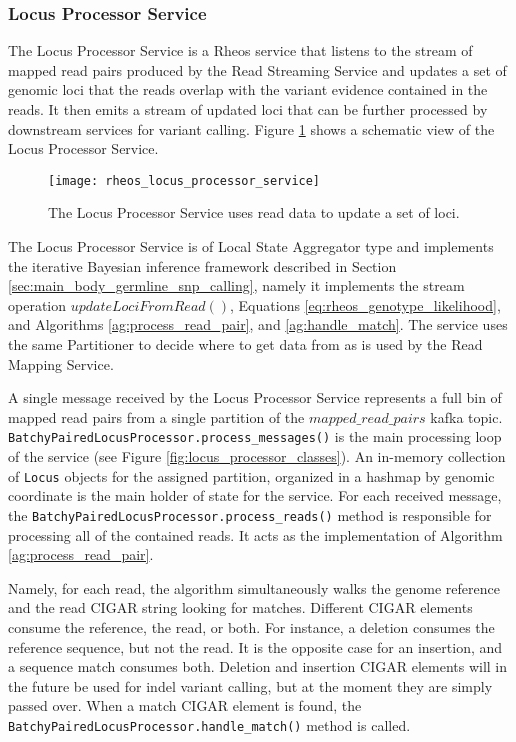 \subsubsection{Locus Processor Service}

The Locus Processor Service is a Rheos service that listens to the stream of mapped read pairs produced by the Read Streaming Service and updates a set of genomic loci that the reads overlap with the variant evidence contained in the reads. It then emits a stream of updated loci that can be further processed by downstream services for variant calling. Figure \ref{fig:rheos_locus_processor_service} shows a schematic view of the Locus Processor Service.

\begin{figure}[h!]
    \texttt{[image: rheos\_locus\_processor\_service]}
    \centering
    \caption {The Locus Processor Service uses read data to update a set of loci.}
    \label{fig:rheos_locus_processor_service}
\end{figure}

The Locus Processor Service is of Local State Aggregator type and implements the iterative Bayesian inference framework described in Section \ref{sec:main_body_germline_snp_calling}, namely it implements the stream operation $updateLociFromRead()$, Equations \ref{eq:rheos_genotype_likelihood}, and Algorithms \ref{ag:process_read_pair}, and \ref{ag:handle_match}. The service uses the same Partitioner to decide where to get data from as is used by the Read Mapping Service.

A single message received by the Locus Processor Service represents a full bin of mapped read pairs from a single partition of the $mapped\_read\_pairs$ kafka topic. \texttt{BatchyPairedLocusProcessor.process_messages()} is the main processing loop of the service (see Figure \ref{fig:locus_processor_classes}). An in-memory collection of \texttt{Locus} objects for the assigned partition, organized in a hashmap by genomic coordinate is the main holder of state for the service. For each received message, the \texttt{BatchyPairedLocusProcessor.process_reads()} method is responsible for processing all of the contained reads. It acts as the implementation of Algorithm \ref{ag:process_read_pair}.

Namely, for each read, the algorithm simultaneously walks the genome reference and the read CIGAR string looking for matches. Different CIGAR elements consume the reference, the read, or both. For instance, a deletion consumes the reference sequence, but not the read. It is the opposite case for an insertion, and a sequence match consumes both. Deletion and insertion CIGAR elements will in the future be used for indel variant calling, but at the moment they are simply passed over. When a match CIGAR element is found, the \texttt{BatchyPairedLocusProcessor.handle_match()} method is called.

